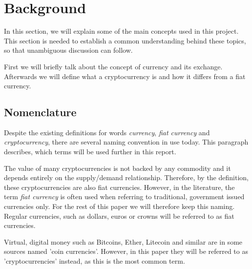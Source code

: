 \section{Background}
% 
In this section, we will explain some of the main concepts used in this project. This section is needed to establish a common understanding behind these topics, so that unambiguous discussion can follow.

First we will briefly talk about the concept of currency and its exchange. Afterwards we will define what a cryptocurrency is and how it differs from a fiat currency. 
% 

% 

% 

% 

% 



\subsection{Nomenclature}
Despite the existing definitions for words \textit{currency}, \textit{fiat currency} and \textit{cryptocurrency}, there are several naming convention in use today. This paragraph describes, which terms will be used further in this report.

The value of many cryptocurrencies is not backed by any commodity and it depends entirely on the supply/demand relationship. Therefore, by the definition, these cryptocurrencies are also fiat currencies. However, in the literature, the term \emph{fiat currency} is often used when referring to traditional, government issued currencies only. For the rest of this paper we will therefore keep this naming. Regular currencies, such as dollars, euros or crowns will be referred to as fiat currencies.

Virtual, digital money such as Bitcoins, Ether, Litecoin and similar are in some sources named 'coin currencies'. However, in this paper they will be referred to as 'cryptocurrencies' instead, as this is the most common term.